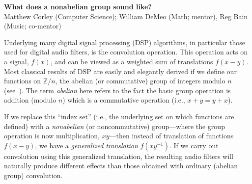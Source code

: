 \documentclass[10pt]{article}
\begin{document}
\begin{center}
{\bf What does a nonabelian group sound like?}\\
Matthew Corley (Computer Science); William DeMeo (Math; mentor), Reg
Bain (Music; co-mentor)
\end{center}

Underlying many digital signal processing (DSP) algorithms, in particular those
used for digital audio filters, is the convolution operation.  This operation
acts on a signal, $f(x)$, and can be viewed as a weighted sum of translations
$f(x-y)$. Most classical results of DSP are easily and elegantly derived if we
define our functions on $\mathbb{Z}/n$, the abelian (or commutative) group of
integers modulo $n$ (see~\cite{Tolimieri:1998}).
  The term \emph{abelian} here refers to the fact the basic
group operation is addition (modulo $n$) which is a commutative operation (i.e.,
$x+y = y+x$).

If we replace this ``index set'' (i.e., the underlying set on which functions
are defined) with a \emph{nonabelian} (or noncommutative) group---where the
group operation is now multiplication, $xy$---then instead of translation of
functions $f(x-y)$, we have a \emph{generalized translation} $f(xy^{-1})$.  If
we carry out convolution using this generalized translation, the resulting audio
filters will naturally produce different effects than those obtained with
ordinary (abelian group) convolution.  
\end{document}
